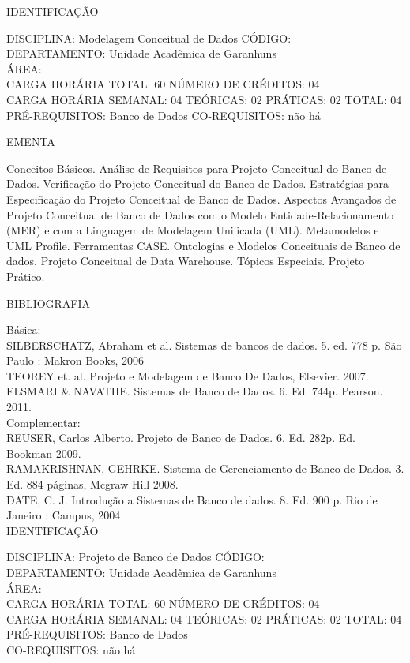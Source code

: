 \documentclass[
	12pt,				%
	openright,			%
  oneside,     %
	a4paper,			%
	english,			%
	french,				%
	spanish,			%
	brazil				%
	]{abntex2}
\begin{document}
\begin{apendicesenv}
\newpage IDENTIFICAÇÃO

DISCIPLINA: Modelagem Conceitual de Dados CÓDIGO:\\
DEPARTAMENTO: Unidade Acadêmica de Garanhuns\\
ÁREA: \\
CARGA HORÁRIA TOTAL: 60 NÚMERO DE CRÉDITOS: 04\\
CARGA HORÁRIA SEMANAL: 04 TEÓRICAS: 02 PRÁTICAS: 02 TOTAL: 04\\
PRÉ-REQUISITOS: Banco de Dados
CO-REQUISITOS: não há

EMENTA 

Conceitos Básicos. Análise de Requisitos para Projeto Conceitual do
Banco de Dados. Verificação do Projeto Conceitual do Banco de Dados.
Estratégias para Especificação do Projeto Conceitual de Banco de Dados.
Aspectos Avançados de Projeto Conceitual de Banco de Dados com o Modelo
Entidade-Relacionamento (MER) e com a Linguagem de Modelagem Unificada
(UML). Metamodelos e UML Profile. Ferramentas CASE. Ontologias e
Modelos Conceituais de Banco de dados. Projeto Conceitual de Data
Warehouse. Tópicos Especiais. Projeto Prático.

BIBLIOGRAFIA 

Básica:\\
SILBERSCHATZ, Abraham et al. Sistemas de bancos de dados. 5. ed. 778 p.
São Paulo : Makron Books, 2006\\
TEOREY et. al.  Projeto e Modelagem de Banco De Dados, Elsevier.
2007.\\
ELSMARI \& NAVATHE. Sistemas de Banco de Dados. 6. Ed. 744p. Pearson.
2011.\\
Complementar:\\
REUSER, Carlos Alberto. Projeto de Banco de Dados. 6. Ed. 282p. Ed.
Bookman 2009.\\
RAMAKRISHNAN, GEHRKE. Sistema de Gerenciamento de Banco de Dados. 3. Ed.
884 páginas, Mcgraw Hill 2008.\\
DATE, C. J. Introdução a Sistemas de Banco de dados. 8. Ed. 900 p. Rio de Janeiro : Campus, 2004\\

\newpage IDENTIFICAÇÃO

DISCIPLINA: Projeto de Banco de Dados CÓDIGO:\\
DEPARTAMENTO: Unidade Acadêmica de Garanhuns\\
ÁREA: \\
CARGA HORÁRIA TOTAL: 60 NÚMERO DE CRÉDITOS: 04\\
CARGA HORÁRIA SEMANAL: 04 TEÓRICAS: 02 PRÁTICAS: 02 TOTAL: 04\\
PRÉ-REQUISITOS: Banco de Dados\\
CO-REQUISITOS: não há


\end{apendicesenv}
\end{document}
